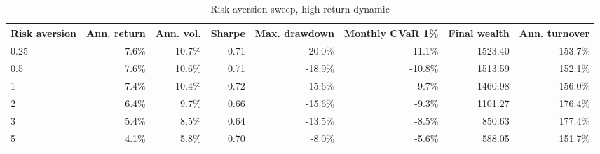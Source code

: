 \begin{table}[!htbp]
\centering
\caption{Risk-aversion sweep, high-return dynamic}
\label{tab:allocation-risk-aversion-high-return}
\small
\setlength{\tabcolsep}{5pt}
\renewcommand{\arraystretch}{1.12}
\begin{adjustbox}{center,max width=\linewidth}
\begin{tabular}{lrrrrrrr}
\toprule
Risk aversion & Ann. return & Ann. vol. & Sharpe & Max. drawdown & Monthly CVaR 1\% & Final wealth & Ann. turnover \\
\midrule
0.25 & 7.6\% & 10.7\% & 0.71 & -20.0\% & -11.1\% & 1523.40 & 153.7\% \\
0.5 & 7.6\% & 10.6\% & 0.71 & -18.9\% & -10.8\% & 1513.59 & 152.1\% \\
1 & 7.4\% & 10.4\% & 0.72 & -15.6\% & -9.7\% & 1460.98 & 156.0\% \\
2 & 6.4\% & 9.7\% & 0.66 & -15.6\% & -9.3\% & 1101.27 & 176.4\% \\
3 & 5.4\% & 8.5\% & 0.64 & -13.5\% & -8.5\% & 850.63 & 177.4\% \\
5 & 4.1\% & 5.8\% & 0.70 & -8.0\% & -5.6\% & 588.05 & 151.7\% \\
\bottomrule
\end{tabular}
\end{adjustbox}
\end{table}